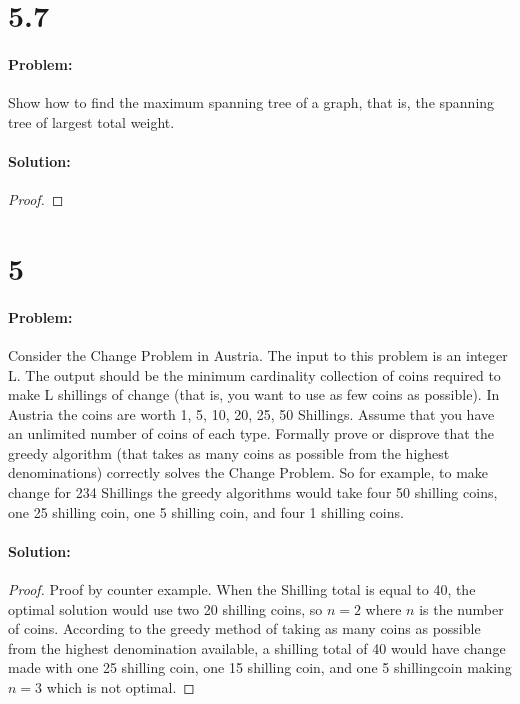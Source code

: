 \documentclass[12pt]{article}
\begin{document}
\section*{5.7}
\paragraph{Problem:}
Show how to find the maximum spanning tree of a graph, that is, the spanning tree of largest
total weight.
\paragraph{Solution:}
\begin{proof}
\end{proof}

\section*{5}
\paragraph{Problem:}
Consider the Change Problem in Austria. The input to this problem is
an integer L. The output should be the minimum cardinality collection
of coins required to make L shillings of change (that is, you want to use
as few coins as possible). In Austria the coins are worth 1, 5, 10, 20, 25,
50 Shillings. Assume that you have an unlimited number of coins of each
type. Formally prove or disprove that the greedy algorithm (that takes as
many coins as possible from the highest denominations) correctly solves
the Change Problem. So for example, to make change for 234 Shillings the
greedy algorithms would take four 50 shilling coins, one 25 shilling coin,
one 5 shilling coin, and four 1 shilling coins.
\paragraph{Solution:}
\begin{proof}
Proof by counter example.
When the Shilling total is equal to 40, the optimal solution would use two 20 shilling coins, so $n=2$ where $n$ is the number of coins.  According to the greedy method of taking as many coins as possible from the highest denomination available, a shilling total of 40 would have change made with one 25 shilling coin, one 15 shilling coin, and one 5 shillingcoin making $n=3$ which is not optimal.
\end{proof}
\end{document}
